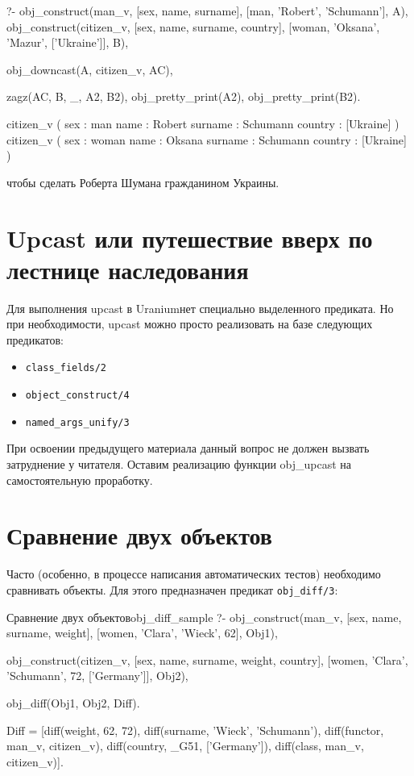 \documentclass[a4paper]{book}
\def\ur{Uranium}
\begin{document}
\begin{example}{}{}
?- obj_construct(man_v, [sex, name, surname], 
                        [man, 'Robert', 'Schumann'], A), 
   obj_construct(citizen_v, [sex, name, surname, country], 
                 [woman, 'Oksana', 'Mazur', ['Ukraine']], B), 

   obj_downcast(A, citizen_v, AC),

   zagz(AC, B, _, A2, B2), 
   obj_pretty_print(A2), 
   obj_pretty_print(B2).

citizen_v ( 
  sex : man 
  name : Robert 
  surname : Schumann 
  country : [Ukraine] 
) 
citizen_v ( 
  sex : woman 
  name : Oksana 
  surname : Schumann 
  country : [Ukraine] 
) 
\end{example}

чтобы сделать Роберта Шумана гражданином Украины.

\section{Upcast или путешествие вверх по лестнице наследования}
\label{upcast}

Для выполнения upcast в \ur нет специально выделенного
предиката. Но при необходимости, upcast можно просто реализовать
на базе следующих предикатов:

\begin{itemize}
\item \verb|class_fields/2|
\item \verb|object_construct/4|
\item \verb|named_args_unify/3|
\end{itemize}


При освоении предыдущего материала данный вопрос не должен
вызвать затруднение у читателя. Оставим реализацию функции
obj_upcast на самостоятельную проработку.

\section{Сравнение двух объектов}
\label{obj_diff}

Часто (особенно, в процессе написания автоматических тестов)
необходимо сравнивать объекты. Для этого предназначен предикат
\verb|obj_diff/3|:

\begin{example}{Сравнение двух объектов}{obj_diff_sample}
?- obj_construct(man_v, 
      [sex, name, surname, weight], 
      [women, 'Clara', 'Wieck', 62], Obj1), 
   
   obj_construct(citizen_v, 
      [sex, name, surname, weight, country], 
      [women, 'Clara', 'Schumann', 72, ['Germany']], Obj2), 

   obj_diff(Obj1, Obj2, Diff).

Diff = [diff(weight, 62, 72), diff(surname, 'Wieck', 'Schumann'), diff(functor, man_v, citizen_v), diff(country, _G51, ['Germany']), diff(class, man_v, citizen_v)].
\end{example}
\end{document}
